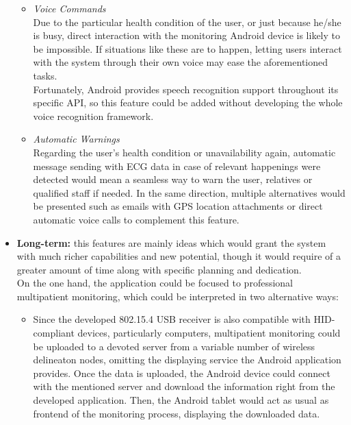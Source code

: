 \begin{itemize}
\begin{itemize}
					\item \emph{Voice Commands}\\
						Due to the particular health condition of the user, or just because he/she is busy,
						direct interaction with the monitoring Android device is likely to be impossible. If
						situations like these are to happen, letting users interact with the system through
						their own voice may ease the aforementioned tasks.\\

						Fortunately, Android provides speech recognition support throughout its specific API,
						so this feature could be added without developing the whole voice recognition framework.\\

					\item \emph{Automatic Warnings}\\
						Regarding the user's health condition or unavailability again, automatic message sending
						with ECG data in case of relevant happenings were detected would mean a seamless way to
						warn the user, relatives or qualified staff if needed. In the same direction, multiple
						alternatives would be presented such as emails with GPS location attachments or direct
						automatic voice calls to complement this feature.

				\end{itemize}

			\item \textbf{Long-term:} this features are mainly ideas which would grant the system with much 
				richer capabilities and new potential, though it would require of a greater amount of time
				along with specific planning and dedication.\\

				On the one hand, the application could be focused to professional multipatient monitoring,
				which could be interpreted in two alternative ways:

				\begin{itemize}
					\item Since the developed 802.15.4 USB receiver is also compatible with HID-compliant
						devices, particularly computers, multipatient monitoring could be uploaded to a
						devoted server from a variable number of wireless delineaton nodes, omitting the 
						displaying service the Android application provides. Once the data is uploaded,
						the Android device could connect with the mentioned server and download the information
						right from the developed application. Then, the Android tablet would act as usual
						as frontend of the monitoring process, displaying the downloaded data.


\end{itemize}
\end{itemize}
